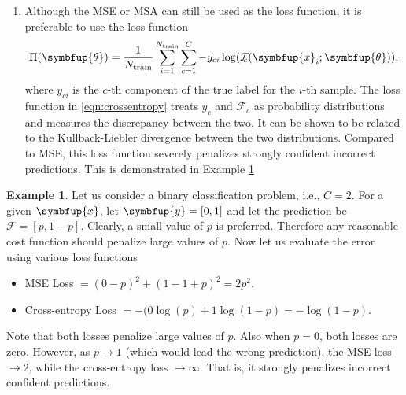 \documentclass[11pt]{extarticle}
\newcommand{\ds}{\displaystyle}
\newcommand{\vx}{\symbfup{x}}
\newcommand{\vy}{\symbfup{y}}
\theoremstyle{definition}
\newcommand{\btheta}{\symbfup{\theta}}
\newtheorem{example}{Example}%
\begin{document}
\begin{enumerate}
  \item Although the MSE or MSA can still be used as the loss function, it is preferable to use the  loss function
    \begin{equation}\label{eqn:crossentropy}
      \Pi(\btheta) = \frac{1}{N_\text{train}} \sum_{i=1}^{N_\text{train}} \sum_{c=1}^{C} - y_{ci} \log(\mathcal{F}_{\!\!\!c}(\vx_i;\btheta)),
    \end{equation}
    where $y_{ci}$ is the $c$-th component of the true label for the $i$-th sample.
    The loss function in \eqref{eqn:crossentropy} treats $y_c$ and $\mathcal{F}_{\!\!\!c}$ as probability distributions and measures the discrepancy between the two. It can be shown to be related to the Kullback-Liebler divergence between the two distributions. Compared to MSE, this loss function severely penalizes strongly confident incorrect predictions. This is demonstrated in Example \ref{ex:cr_ent}
\end{enumerate}

\begin{example}\label{ex:cr_ent}
  Let us consider a binary classification problem, i.e., $C=2$. For a given $\vx$, let $\vy = [0,1]$ and let the prediction be $\mathcal{F} = [p, 1-p]$. Clearly, a small value of $p$ is preferred. Therefore any reasonable cost function should penalize large values of $p$. Now let us evaluate the error using various loss functions
\begin{itemize}
  \item MSE Loss $\ds= (0-p)^2 + (1 - 1 +p)^2 = 2p^2$.
  \item Cross-entropy Loss $\ds= -(0 \log(p) + 1 \log(1-p) = - \log(1-p)$.
\end{itemize}
Note that both losses penalize large values of $p$. Also when $p = 0$, both losses are zero. However, as $p \to 1$ (which would lead the wrong prediction), the MSE loss $\to 2$, while the cross-entropy loss $\to \infty$. That is, it strongly penalizes incorrect confident predictions. 
\end{example}



\end{document}
